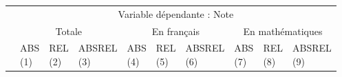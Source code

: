\documentclass[
]{book}
\begin{document}
\begin{landscape}
\begin{ThreePartTable}
\begin{longtable}[t]{llllllllll}
\toprule
\multicolumn{1}{c}{} & \multicolumn{9}{c}{Variable dépendante : Note} \\
\cmidrule(l{3pt}r{3pt}){2-10}
\multicolumn{1}{c}{} & \multicolumn{3}{c}{Totale} & \multicolumn{3}{c}{En français} & \multicolumn{3}{c}{En mathématiques} \\
\cmidrule(l{3pt}r{3pt}){2-4} \cmidrule(l{3pt}r{3pt}){5-7} \cmidrule(l{3pt}r{3pt}){8-10}
 & \makecell{ABS \\ (1) } & \makecell{REL \\ (2) } & \makecell{ABSREL \\ (3) } & \makecell{ABS \\ (4) } & \makecell{REL \\ (5) } & \makecell{ABSREL \\ (6) } & \makecell{ABS \\ (7) } & \makecell{REL \\ (8) } & \makecell{ABSREL \\ (9) }\\
\midrule
\endhead


\end{longtable}
\end{ThreePartTable}
\end{landscape}
\end{document}

